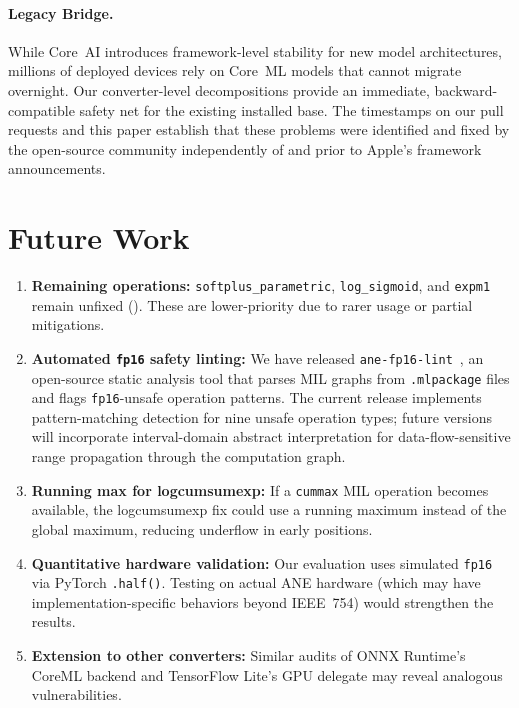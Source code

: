\documentclass[10pt,twocolumn]{article}
\newcommand{\fp}{\texttt{fp16}}
\newcommand{\ane}{ANE}
\newcommand{\coreml}{Core~ML}
\begin{document}
\paragraph{Legacy Bridge.}
While Core~AI introduces framework-level stability for new model architectures,
millions of deployed devices rely on \coreml{} models that cannot migrate
overnight.  Our converter-level decompositions provide an immediate,
backward-compatible safety net for the existing installed base.  The timestamps
on our pull requests and this paper establish that these problems were identified
and fixed by the open-source community independently of and prior to Apple's
framework announcements.


\section{Future Work}
\label{sec:future}

\begin{enumerate}[leftmargin=*,itemsep=2pt]
  \item \textbf{Remaining operations:}
    \texttt{softplus\_parametric}, \texttt{log\_sigmoid}, and
    \texttt{expm1} remain unfixed ().
    These are lower-priority due to rarer usage or partial
    mitigations.

  \item \textbf{Automated \fp{} safety linting:} We have released
    \texttt{ane-fp16-lint}~\citep{singh2026lint}, an open-source static
    analysis tool that parses MIL graphs from \texttt{.mlpackage} files
    and flags \fp{}-unsafe operation patterns.  The current release
    implements pattern-matching detection for nine unsafe operation types;
    future versions will incorporate interval-domain abstract interpretation
    for data-flow-sensitive range propagation through the computation graph.

  \item \textbf{Running max for logcumsumexp:} If a \texttt{cummax} MIL
    operation becomes available, the logcumsumexp fix could use a running maximum
    instead of the global maximum, reducing underflow in early positions.

  \item \textbf{Quantitative hardware validation:} Our evaluation uses simulated
    \fp{} via PyTorch \texttt{.half()}.  Testing on actual \ane{} hardware
    (which may have implementation-specific behaviors beyond IEEE~754) would
    strengthen the results.

  \item \textbf{Extension to other converters:} Similar audits of
    ONNX Runtime's CoreML backend and TensorFlow Lite's GPU delegate
    may reveal analogous vulnerabilities.
\end{enumerate}
\end{document}

